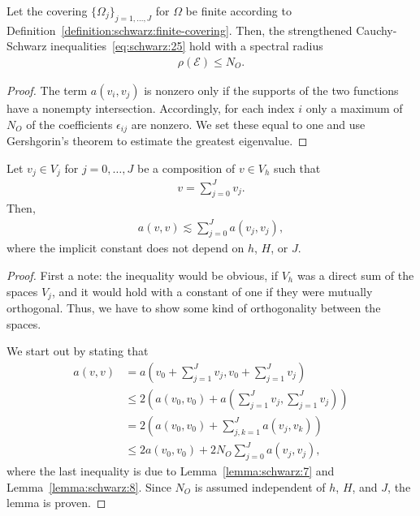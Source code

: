 \begin{lemma}
  \label{lemma:schwarz:8}
  Let the covering $\{\Omega_j\}_{j=1,\dots,J}$ for $\Omega$ be finite
  according to
  Definition~\ref{definition:schwarz:finite-covering}. Then, the
  strengthened Cauchy-Schwarz inequalities~\eqref{eq:schwarz:25} hold
  with a spectral radius
  \begin{gather}
    \label{eq:schwarz:26}
    \rho(\mathcal E) \le N_O.
  \end{gather}
\end{lemma}

\begin{proof}
  The term $a(v_i, v_j)$ is nonzero only if the supports of the two
  functions have a nonempty intersection. Accordingly, for each index
  $i$ only a maximum of $N_O$ of the coefficients $\epsilon_{ij}$ are
  nonzero. We set these equal to one and use Gershgorin's theorem to
  estimate the greatest eigenvalue.
\end{proof}

\begin{lemma}
  \label{lemma:schwarz:6}
  Let $v_j\in V_j$ for $j=0,\dots,J$ be a composition of $v\in V_h$
  such that
  \begin{gather*}
    v=\sum_{j=0}^J v_j.
  \end{gather*}
  Then,
  \begin{gather}
    \label{eq:schwarz:12}
    a(v,v) \lesssim \sum_{j=0}^J a(v_j, v_j),
  \end{gather}
  where the implicit constant does not depend on $h$, $H$, or $J$.
\end{lemma}

\begin{proof}
  First a note: the inequality would be obvious, if $V_h$ was a direct
  sum of the spaces $V_j$, and it would hold with a constant of one if
  they were mutually orthogonal. Thus, we have to show some kind of
  orthogonality between the spaces.

  We start out by stating that
  \begin{align*}
    a(v,v) &= a\left(v_0+\sum_{j=1}^J v_j, v_0+\sum_{j=1}^J v_j\right)
    \\
    &\le 2 \left(a(v_0, v_0) + a\!\left(\sum_{j=1}^J v_j,\sum_{j=1}^J
        v_j\right)\right)
    \\
    &= 2 \left(a(v_0, v_0) + \sum_{j,k=1}^J a(v_j,v_k)\right) \\
    & \le 2 a(v_0, v_0) + 2 N_O \sum_{j=0}^J a(v_j, v_j),
  \end{align*}
  where the last inequality is due to Lemma~\ref{lemma:schwarz:7} and
  Lemma~\ref{lemma:schwarz:8}. Since $N_O$ is assumed independent of
  $h$, $H$, and $J$, the lemma is proven.
\end{proof}


